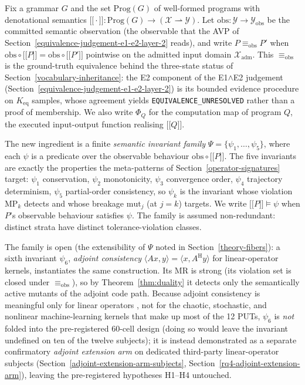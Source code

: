 \documentclass[manuscript,screen,review]{acmart}
\begin{document}
Fix a grammar $G$ and the set $\mathrm{Prog}(G)$ of well-formed programs
with denotational semantics
$\mathopen{\lbrack\!\lbrack}\cdot\mathclose{\rbrack\!\rbrack} : \mathrm{Prog}(G) \to (\mathcal{X} \rightharpoonup \mathcal{Y})$.
Let $\mathrm{obs} : \mathcal{Y} \to \mathcal{Y}_{\mathrm{obs}}$ be the committed
semantic observation (the observable that the AVP of Section~\ref{equivalence-judgement-e1-e2-layer-2} reads), and
write $P \equiv_{\mathrm{obs}} P'$ when
$\mathrm{obs} \circ \mathopen{\lbrack\!\lbrack} P \mathclose{\rbrack\!\rbrack} = \mathrm{obs} \circ \mathopen{\lbrack\!\lbrack} P' \mathclose{\rbrack\!\rbrack}$
pointwise on the admitted input domain $\mathcal{X}_{\mathrm{adm}}$.
This $\equiv_{\mathrm{obs}}$ is the ground-truth equivalence behind the
three-state status of Section~\ref{vocabulary-inheritance}: the E2 component of the E1$\wedge$E2 judgement
(Section~\ref{equivalence-judgement-e1-e2-layer-2}) is its bounded evidence procedure on $K_{\mathrm{eq}}$
samples, whose agreement yields \texttt{EQUIVALENCE\_UNRESOLVED} rather
than a proof of membership. We also write $\Phi_Q$ for the computation
map of program $Q$, the executed input-output function realising
$\mathopen{\lbrack\!\lbrack} Q \mathclose{\rbrack\!\rbrack}$.

The new ingredient is a finite \emph{semantic invariant family}
$\Psi = \{\psi_1, \dots, \psi_5\}$, where each $\psi$ is a predicate over
the observable behaviour $\mathrm{obs} \circ \mathopen{\lbrack\!\lbrack} P \mathclose{\rbrack\!\rbrack}$. The five
invariants are exactly the properties the meta-patterns of Section~\ref{operator-signatures} target:
$\psi_1$ conservation, $\psi_2$ monotonicity, $\psi_3$ convergence order,
$\psi_4$ trajectory determinism, $\psi_5$ partial-order consistency, so
$\psi_k$ is the invariant whose violation MP$_k$ detects and whose
breakage $\mathrm{mut}_j$ (at $j=k$) targets. We write
$\mathopen{\lbrack\!\lbrack} P \mathclose{\rbrack\!\rbrack} \models \psi$ when $P$'s observable behaviour
satisfies $\psi$. The family is assumed non-redundant: distinct strata
have distinct tolerance-violation classes.

The family is open (the extensibility of $\Psi$ noted in Section~\ref{theory-fibers}): a sixth
invariant $\psi_6$, \emph{adjoint consistency}
$\langle A x, y\rangle = \langle x, A^{\mathrm{H}} y\rangle$ for
linear-operator kernels, instantiates the same construction. Its MR is
strong (its violation set is closed under $\equiv_{\mathrm{obs}}$), so by
Theorem~\ref{thm:duality} it detects only the semantically active mutants of the adjoint code
path. Because adjoint consistency is meaningful only for linear operators
, not for the chaotic, stochastic, and nonlinear machine-learning
kernels that make up most of the 12 PUTs, $\psi_6$ is \emph{not} folded
into the pre-registered 60-cell design (doing so would leave the invariant
undefined on ten of the twelve subjects); it is instead demonstrated as a
separate confirmatory \emph{adjoint extension arm} on dedicated
third-party linear-operator subjects (Section~\ref{adjoint-extension-arm-subjects}, Section~\ref{rq4-adjoint-extension-arm}), leaving the
pre-registered hypotheses H1--H4 untouched.
\end{document}
